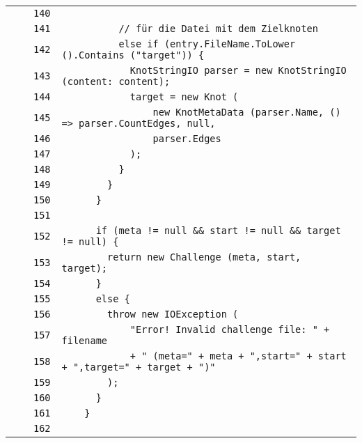 \documentclass[a4paper,10pt]{article}
\begin{document}
\begin{longtable}[l]{lrrl}
\cellcolor{gray} &  & \verb~140~ & \verb~~\\
\cellcolor{gray} &  & \verb~141~ & \verb~          // für die Datei mit dem Zielknoten~\\
\cellcolor{gray} &  & \verb~142~ & \verb~          else if (entry.FileName.ToLower ().Contains ("target")) {~\\
\cellcolor{gray} &  & \verb~143~ & \verb~            KnotStringIO parser = new KnotStringIO (content: content);~\\
\cellcolor{gray} &  & \verb~144~ & \verb~            target = new Knot (~\\
\cellcolor{gray} &  & \verb~145~ & \verb~                new KnotMetaData (parser.Name, () => parser.CountEdges, null, ~\\
\cellcolor{gray} &  & \verb~146~ & \verb~                parser.Edges~\\
\cellcolor{gray} &  & \verb~147~ & \verb~            );~\\
\cellcolor{gray} &  & \verb~148~ & \verb~          }~\\
\cellcolor{gray} &  & \verb~149~ & \verb~        }~\\
\cellcolor{gray} &  & \verb~150~ & \verb~      }~\\
\cellcolor{gray} &  & \verb~151~ & \verb~~\\
\cellcolor{gray} &  & \verb~152~ & \verb~      if (meta != null && start != null && target != null) {~\\
\cellcolor{gray} &  & \verb~153~ & \verb~        return new Challenge (meta, start, target);~\\
\cellcolor{gray} &  & \verb~154~ & \verb~      }~\\
\cellcolor{gray} &  & \verb~155~ & \verb~      else {~\\
\cellcolor{gray} &  & \verb~156~ & \verb~        throw new IOException (~\\
\cellcolor{gray} &  & \verb~157~ & \verb~            "Error! Invalid challenge file: " + filename~\\
\cellcolor{gray} &  & \verb~158~ & \verb~            + " (meta=" + meta + ",start=" + start + ",target=" + target + ")"~\\
\cellcolor{gray} &  & \verb~159~ & \verb~        );~\\
\cellcolor{gray} &  & \verb~160~ & \verb~      }~\\
\cellcolor{gray} &  & \verb~161~ & \verb~    }~\\
\cellcolor{gray} &  & \verb~162~ & \verb~~\\

\end{longtable}
\end{document}
